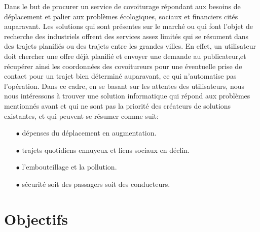 Dans le but de procurer un service de covoiturage répondant aux besoins de déplacement et palier aux problèmes écologiques, sociaux et financiers cités auparavant.\newline
Les solutions qui sont présentes sur le marché ou qui font l'objet de recherche des industriels offrent des services assez limités qui se résument dans des trajets planifiés ou des trajets entre les grandes villes.\newline
En effet, un utilisateur doit chercher une offre déjà planifié et envoyer une demande au publicateur,et récupérer ainsi les coordonnées des covoitureurs pour une éventuelle prise de contact pour un trajet bien déterminé auparavant, ce qui n'automatise pas l’opération.\newline
Dans ce cadre, en se basant sur les attentes des utilisateurs, nous nous intéressons à trouver une solution informatique qui répond aux problèmes mentionnés avant et qui ne sont pas la priorité des créateurs de solutions existantes, et qui peuvent se résumer comme suit:
\begin{itemize}
 
\item[$\bullet$] dépenses du déplacement en augmentation.
\item[$\bullet$] trajets quotidiens ennuyeux et liens sociaux en déclin.
\item[$\bullet$] l'embouteillage et la pollution.
\item[$\bullet$] sécurité soit des passagers soit des conducteurs.
 
\end{itemize}

\section{Objectifs}

